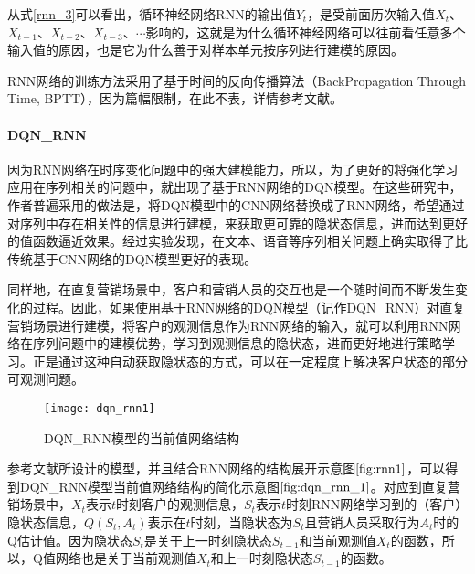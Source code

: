 从式\eqref{rnn_3}可以看出，循环神经网络RNN的输出值$Y_{t}$，是受前面历次输入值$X_{t}$、$X_{t-1}$、$X_{t-2}$、$X_{t-3}$、$\cdots$影响的，这就是为什么循环神经网络可以往前看任意多个输入值的原因，也是它为什么善于对样本单元按序列进行建模的原因。

RNN网络的训练方法采用了基于时间的反向传播算法（BackPropagation Through Time, BPTT），因为篇幅限制，在此不表，详情参考文献\citep{bersini1997simplification}。

 \paragraph{DQN_RNN}
 因为RNN网络在时序变化问题中的强大建模能力，所以，为了更好的将强化学习应用在序列相关的问题中，就出现了基于RNN网络的DQN模型\citep{hausknecht2015deep,narasimhan2015language}。在这些研究中，作者普遍采用的做法是，将DQN模型中的CNN网络替换成了RNN网络，希望通过对序列中存在相关性的信息进行建模，来获取更可靠的隐状态信息，进而达到更好的值函数逼近效果。经过实验发现，在文本、语音等序列相关问题上确实取得了比传统基于CNN网络的DQN模型更好的表现\citep{bakker2002reinforcement,hausknecht2015deep,narasimhan2015language}。

 同样地，在直复营销场景中，客户和营销人员的交互也是一个随时间而不断发生变化的过程。因此，如果使用基于RNN网络的DQN模型（记作DQN_RNN）对直复营销场景进行建模，将客户的观测信息作为RNN网络的输入，就可以利用RNN网络在序列问题中的建模优势，学习到观测信息的隐状态，进而更好地进行策略学习。正是通过这种自动获取隐状态的方式，可以在一定程度上解决客户状态的部分可观测问题。

  \begin{figure}[htbp]
 \centering
 \texttt{[image: dqn\_rnn1]}
 \caption{DQN_RNN模型的当前值网络结构}
 \label{fig:dqn_rnn_1}
 \end{figure}

 参考文献\citep{hausknecht2015deep,narasimhan2015language}所设计的模型，并且结合RNN网络的结构展开示意图$\ref{fig:rnn1}$，可以得到DQN_RNN模型当前值网络结构的简化示意图$\ref{fig:dqn_rnn_1}$。对应到直复营销场景中，$X_{t}$表示$t$时刻客户的观测信息，$S_{t}$表示$t$时刻RNN网络学习到的（客户）隐状态信息，$Q(S_{t}, A_{t})$表示在$t$时刻，当隐状态为$S_{t}$且营销人员采取行为$A_{t}$时的Q估计值。因为隐状态$S_{t}$是关于上一时刻隐状态$S_{t-1}$和当前观测值$X_{t}$的函数，所以，Q值网络也是关于当前观测值$X_{t}$和上一时刻隐状态$S_{t-1}$的函数。

